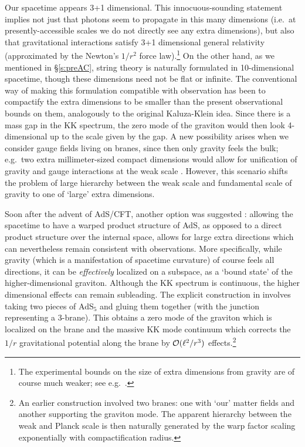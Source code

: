 \documentclass[12pt]{article}
\def\sect#1{\S\ref{#1}}
\def\AC{AdS/CFT}
\def\Rads{\ell}
\begin{document}
Our spacetime appears 3+1 dimensional.  This innocuous-sounding statement implies not just that photons seem to propagate in this many dimensions (i.e.\ at presently-accessible scales we do not directly see any extra dimensions), but also that gravitational interactions satisfy 3+1 dimensional general relativity (approximated by the Newton's $1/r^2$ force law).\footnote{
The experimental bounds on the size of extra dimensions from gravity are of course much weaker; see e.g.\ \cite{ArkaniHamed:1998nn}.
}
On the other hand, as we mentioned in \sect{s:preAC}, string theory is naturally formulated in 10-dimensional spacetime, though these dimensions need not be flat or infinite.  The conventional way of making this formulation compatible with  observation has been to compactify the extra dimensions to be smaller than the present observational bounds on them, analogously to the original Kaluza-Klein idea.  Since there is a mass gap in the KK spectrum, the zero mode of the graviton would then look 4-dimensional up to the scale given by the gap.  A new possibility arises when we consider  gauge fields living on branes, since then only gravity feels the bulk; e.g.\ two extra millimeter-sized compact dimensions would allow for unification of gravity and gauge interactions at the weak scale  \cite{ArkaniHamed:1998rs}.
However, this scenario shifts the problem of large hierarchy between the weak scale and fundamental scale of gravity to one of `large' extra dimensions.

 Soon after the advent of \AC, another option was suggested \cite{Randall:1999vf}: allowing the spacetime to have a warped product structure of AdS, as opposed to a direct product structure over the internal space, allows for large extra directions which can nevertheless remain consistent with observations.
 More specifically, while gravity (which is a manifestation of spacetime curvature) of course feels all directions, it can be {\it effectively} localized on a subspace, as a `bound state' of the higher-dimensional graviton.  Although the KK spectrum is continuous, the higher dimensional effects can remain subleading. The explicit construction in \cite{Randall:1999vf} involves taking two pieces of AdS$_5$ and gluing them together (with the junction representing a 3-brane).  This obtains a zero mode of the graviton which is localized on the brane and the massive KK mode continuum which corrects the $1/r$ gravitational potential along the brane by ${\cal O}(\Rads^2/r^3)$ effects.\footnote{
An earlier construction   \cite{Randall:1999ee} involved two branes: one with `our' matter fields and another supporting the graviton mode.
The apparent hierarchy between the weak and Planck scale is then naturally generated by the warp factor scaling exponentially with compactification radius.
}
\end{document}
